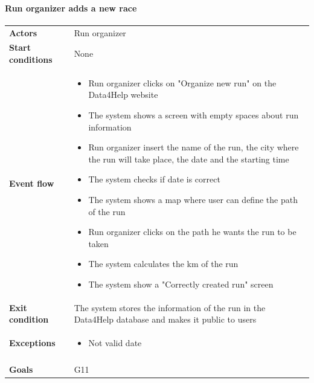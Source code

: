 \paragraph{Run organizer adds a new race}
\begin{center}
\begin{table}[H]
\centering
\begin{tabular}{l|p{}}
\textbf{Actors} & Run organizer \\
\textbf{Start conditions} & None \\
\textbf{Event flow}  & \begin{minipage}[t]{0.7\textwidth}
    \begin{itemize}
    \item Run organizer clicks on "Organize new run" on the Data4Help website 
    \item The system shows a screen with empty spaces about run information
    \item Run organizer insert the name of the run, the city where the run will take place, the date and the starting time
    \item The system checks if date is correct
    \item The system shows a map where user can define the path of the run
    \item Run organizer clicks on the path he wants the run to be taken
    \item The system calculates the km of the run
    \item The system show a "Correctly created run" screen
\end{itemize}
    
\end{minipage} \\
\textbf{Exit condition} & The system stores the information of the run in the Data4Help database and makes it public to users \\
\textbf{Exceptions} & \begin{minipage}[t]{0.7\textwidth}
    \begin{itemize}
\item Not valid date
    \end{itemize}
    
\end{minipage} \\ \\
\textbf{Goals} & G11
\end{tabular}

\end{table}
\end{center}

